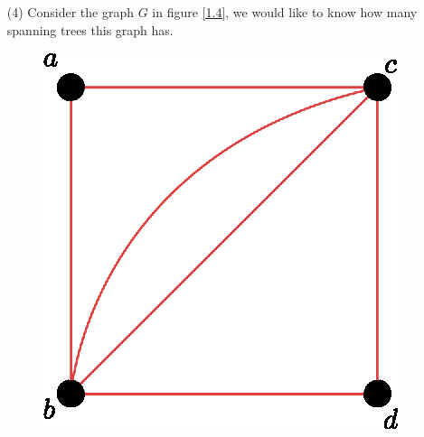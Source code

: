 \begin{example}
\begin{enumerate}
            \item[(4)] Consider the graph $G$ in figure \ref{1.4}, we would like
                to know how many spanning trees this graph has.
                 \begin{figure}[h]
                    \centering
                    \includegraphics[scale=0.5]{Figures/chapter1/matrix_tree.eps}
                    \caption{}
                    \label{fig_1.4}
                \end{figure}


\end{enumerate}
\end{example}
